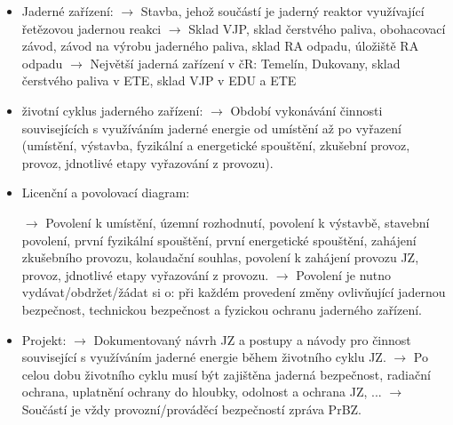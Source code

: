 \begin{itemize}
	\item Jaderné zařízení:	
	$\rightarrow$ Stavba, jehož součástí je jaderný reaktor využívající řetězovou jadernou reakci
	$\rightarrow$ Sklad VJP, sklad čerstvého paliva, obohacovací závod, závod na výrobu jaderného paliva, sklad RA odpadu, úložiště RA odpadu
	$\rightarrow$ Největší jaderná zařízení v čR: Temelín, Dukovany, sklad čerstvého paliva v ETE, sklad VJP v EDU a ETE
	
	\item životní cyklus jaderného zařízení:	
	$\rightarrow$ Období vykonávání činnosti souvisejících s využíváním jaderné energie od umístění až po vyřazení (umístění, výstavba, fyzikální a energetické spouštění, zkušební provoz, provoz, jdnotlivé etapy vyřazování z provozu).

	\item Licenční a povolovací diagram:
	
	$\rightarrow$ Povolení k umístění, územní rozhodnutí, povolení k výstavbě, stavební povolení, první fyzikální spouštění, první energetické spouštění, zahájení zkušebního provozu, kolaudační souhlas, povolení k zahájení provozu JZ, provoz, jdnotlivé etapy vyřazování z provozu. 
    $\rightarrow$ Povolení je nutno vydávat/obdržet/žádat si o: při každém provedení změny ovlivňující jadernou bezpečnost, technickou bezpečnost a fyzickou ochranu jaderného zařízení.

	\item Projekt:	
	$\rightarrow$ Dokumentovaný návrh JZ a postupy a návody pro činnost související s využíváním jaderné energie během životního cyklu JZ.	
	$\rightarrow$ Po celou dobu životního cyklu musí být zajištěna jaderná bezpečnost, radiační ochrana, uplatnění ochrany do hloubky, odolnost a ochrana JZ, ...
    $\rightarrow$ Součástí je vždy provozní/prováděcí bezpečností zpráva PrBZ.
    

\end{itemize}

